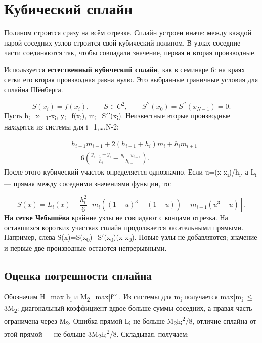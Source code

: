 \documentclass[12pt,a4paper]{article}
\begin{document}
\clearpage
\section{Кубический сплайн}
Полином строится сразу на всём отрезке. Сплайн устроен иначе: между каждой парой соседних узлов строится свой кубический полином. В узлах соседние части соединяются так, чтобы совпадали значение, первая и вторая производные.

Используется \textbf{естественный кубический сплайн}, как в семинаре 6: на краях сетки его вторая производная равна нулю. Это выбранные граничные условия для сплайна Шёнберга.

\[
S(x_i)=f(x_i),\qquad S\in C^2,\qquad S^{\prime\prime}(x_0)=S^{\prime\prime}(x_{N-1})=0.
\]
Пусть h\textsubscript{i}=x\textsubscript{i+1}-x\textsubscript{i}, y\textsubscript{i}=f(x\textsubscript{i}), m\textsubscript{i}=S\ensuremath{\prime\prime}(x\textsubscript{i}). Неизвестные вторые производные находятся из системы для i=1,\ldots{},N-2:

\[
\begin{aligned}&h_{i-1}m_{i-1}+2(h_{i-1}+h_i)m_i+h_im_{i+1}\\ &=6\left(\frac{y_{i+1}-y_i}{h_i}-\frac{y_i-y_{i-1}}{h_{i-1}}\right).\end{aligned}
\]
После этого кубический участок определяется однозначно. Если u=(x-x\textsubscript{i})/h\textsubscript{i}, а L\textsubscript{i} — прямая между соседними значениями функции, то:

\[
S(x)=L_i(x)+\frac{h_i^2}{6}\left[m_i((1-u)^3-(1-u))+m_{i+1}(u^3-u)\right].
\]
\textbf{На сетке Чебышёва} крайние узлы не совпадают с концами отрезка. На оставшихся коротких участках сплайн продолжается касательными прямыми. Например, слева S(x)=S(x\textsubscript{0})+S\ensuremath{\prime}(x\textsubscript{0})(x-x\textsubscript{0}). Новые узлы не добавляются; значение и первые две производные остаются непрерывными.

\subsection{Оценка погрешности сплайна}
Обозначим H=max h\textsubscript{i} и M\textsubscript{2}=max|f\ensuremath{\prime\prime}|. Из системы для m\textsubscript{i} получается max|m\textsubscript{i}|\ensuremath{\leq}3M\textsubscript{2}: диагональный коэффициент вдвое больше суммы соседних, а правая часть ограничена через M\textsubscript{2}. Ошибка прямой L\textsubscript{i} не больше M\textsubscript{2}h\textsubscript{i}\textsuperscript{2}/8, отличие сплайна от этой прямой — не больше 3M\textsubscript{2}h\textsubscript{i}\textsuperscript{2}/8. Складывая, получаем:
\end{document}
